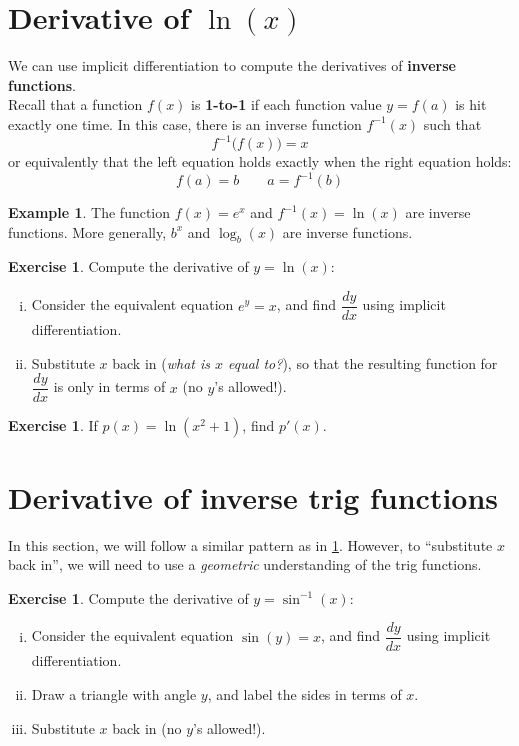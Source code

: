 \documentclass[11pt,reqno,final]{amsart}
\numberwithin{figure}{section}
\theoremstyle{definition} %
\newtheorem{example}[equation]{Example}%
\newtheorem{exercise}[question]{Exercise}
\begin{document}
\newpage

\section{Derivative of $\ln(x)$}
\label{LNX}

We can use implicit differentiation to compute the derivatives of \textbf{inverse functions}.\\
Recall that a function $f(x)$ is \textbf{1-to-1} if each function value $y = f(a)$ is hit exactly one time.
In this case, there is an inverse function $f^{-1}(x)$ such that
\[
        f^{-1}\big( f(x) \big) = x
\]
or equivalently that the left equation holds exactly when the right equation holds:
\[
        f(a) = b
        \qquad
        a = f^{-1}(b)
\]
\begin{example}
        The function $f(x) = e^x$ and $f^{-1}(x) = \ln(x)$ are inverse functions.
        More generally, $b^x$ and $\log_b(x)$ are inverse functions.
\end{example}

\begin{exercise}
        Compute the derivative of $y = \ln(x)$:
        \begin{enumerate}[(i)]
        \item Consider the equivalent equation $e^y = x$, and find $\dfrac{dy}{dx}$ using implicit differentiation.
                \vfill
        \item Substitute $x$ back in (\textit{what is $x$ equal to?}), so that the resulting function for $\dfrac{dy}{dx}$ is only in terms of $x$ (no $y$'s allowed!).
                \vfill
        \end{enumerate}
\end{exercise}

\begin{exercise}
        If $p(x) = \ln(x^2+1)$, find $p'(x)$.
        \vfill
\end{exercise}

\newpage

\section{Derivative of inverse trig functions}

In this section, we will follow a similar pattern as in \cref{LNX}.
However, to ``substitute $x$ back in'', we will need to use a \textit{geometric} understanding of the trig functions.

\begin{exercise}
        Compute the derivative of $y = \sin^{-1}(x)$:
        \begin{enumerate}[(i)]
        \item Consider the equivalent equation $\sin(y) = x$, and find $\dfrac{dy}{dx}$ using implicit differentiation.
                \vfill
        \item Draw a triangle with angle $y$, and label the sides in terms of $x$.
                \vfill
        \item Substitute $x$ back in (no $y$'s allowed!).
                \vfill
        \end{enumerate}
\end{exercise}
\end{document}
